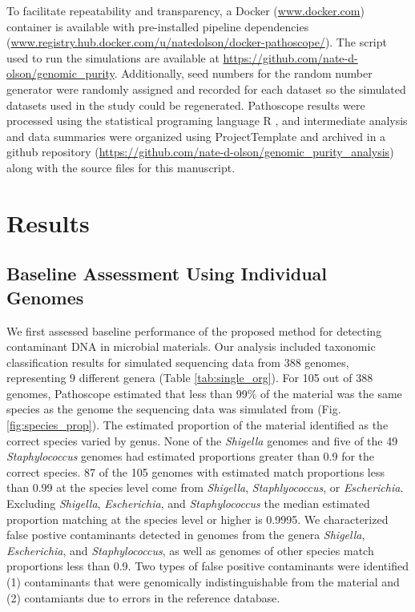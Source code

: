 \documentclass[fleqn,10pt,lineno]{wlpeerj}\usepackage[]{graphicx}\usepackage[]{color}
\begin{document}

To facilitate repeatability and transparency, a Docker (\url{www.docker.com}) container is available 
with pre-installed pipeline dependencies (\url{www.registry.hub.docker.com/u/natedolson/docker-pathoscope/}). 
The script used to run the simulations are available at \url{https://github.com/nate-d-olson/genomic_purity}.
Additionally, seed numbers for the random number generator were randomly assigned and recorded for each dataset so the simulated datasets used in the study could be regenerated.
Pathoscope results were processed using the statistical programing language R \citep{R}, and intermediate analysis and data summaries were organized using ProjectTemplate \citep{ProjectTemplate} and archived in a github repository (\url{https://github.com/nate-d-olson/genomic_purity_analysis}) along with the source files for this manuscript.

\section*{Results}

\subsection*{Baseline Assessment Using Individual Genomes}


We first assessed baseline performance of the proposed method for detecting contaminant DNA in microbial materials. 
Our analysis included taxonomic classification results for simulated sequencing data  from 388 genomes, representing 9 different genera (Table \ref{tab:single_org}). 
For 105 out of 388 genomes, Pathoscope estimated that less than 99\% of the material was the same species as the genome the sequencing data was simulated from (Fig. \ref{fig:species_prop}). 
The estimated proportion of the material identified as the correct species varied by genus. 
None of the \textit{Shigella} genomes and five of the 49 \textit{Staphylococcus} genomes had estimated proportions greater than 0.9 for the correct species. 
87 of the 105 genomes with estimated match proportions less than 0.99 at the species level come from \textit{Shigella}, \textit{Staphlyococcus}, or \textit{Escherichia}. 
Excluding \textit{Shigella}, \textit{Escherichia}, and \textit{Staphylococcus} the median estimated proportion matching at the species level or higher is  0.9995. 
We characterized false postive contaminants detected in genomes from the genera \textit{Shigella}, \textit{Escherichia}, and \textit{Staphylococcus}, as well as genomes of other species match proportions less than 0.9. 
Two types of false positive contaminants were identified (1) contaminants that were genomically indistinguishable from the material and (2) contamiants due to errors in the reference database.
\end{document}
